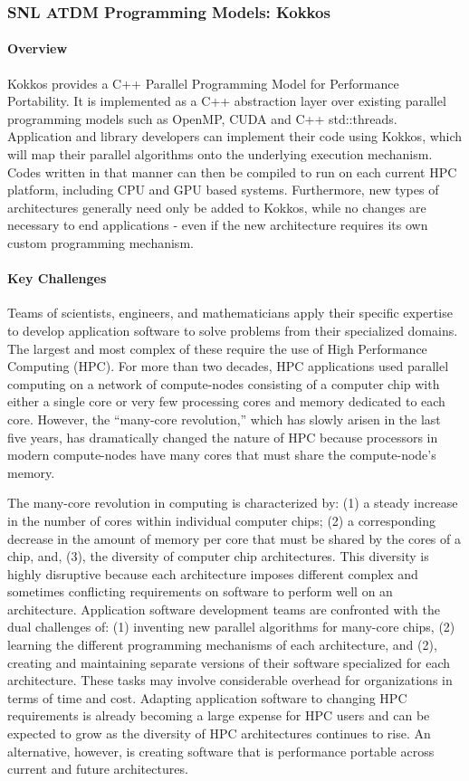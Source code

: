 \subsubsection{SNL ATDM Programming Models: Kokkos} 

\paragraph{Overview} 
Kokkos provides a C++ Parallel Programming Model for Performance Portability. 
It is implemented as a C++ abstraction layer over existing parallel programming models such as OpenMP, CUDA and C++ std::threads. 
Application and library developers can implement their code using Kokkos, 
which will map their parallel algorithms onto the underlying execution mechanism. 
Codes written in that manner can then be compiled to run on each current HPC platform, including CPU and GPU based systems.
Furthermore, new types of architectures generally need only be added to Kokkos, while no changes are necessary to end applications - even if the new architecture requires its own custom programming mechanism. 

\paragraph{Key  Challenges}
Teams of scientists, engineers, and mathematicians apply their specific expertise to develop application software 
to solve problems from their specialized domains. 
The largest and most complex of these require the use of High Performance Computing (HPC). 
For more than two decades, HPC applications used parallel computing on a network of compute-nodes 
consisting of a computer chip with either a single core or very few processing cores 
and memory dedicated to each core. 
However, the “many-core revolution,” which has slowly arisen in the last five years, 
has dramatically changed the nature of HPC because processors in modern compute-nodes 
have many cores that must share the compute-node’s memory.

The many-core revolution in computing is characterized by: 
(1) a steady increase in the number of cores within individual computer chips; 
(2) a corresponding decrease in the amount of memory per core that must be shared by the cores of a chip, and, 
(3), the diversity of computer chip architectures. 
This diversity is highly disruptive because each architecture imposes different complex 
and sometimes conflicting requirements on software to perform well on an architecture. 
Application software development teams are confronted with the dual challenges of: 
(1) inventing new parallel algorithms for many-core chips, 
(2) learning the different programming mechanisms of each architecture, and
(2), creating and maintaining separate versions of their software specialized for each architecture. 
These tasks may involve considerable overhead for organizations in terms of time and cost. 
Adapting application software to changing HPC requirements is already becoming a large expense for 
HPC users and can be expected to grow as the diversity of HPC architectures continues to rise.
An alternative, however, is creating software that is performance portable across current and future architectures. 

